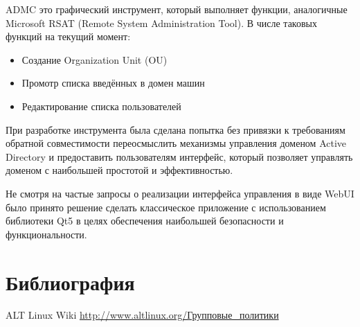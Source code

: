 ADMC это графический инструмент, который выполняет функции, аналогичные
Microsoft RSAT (Remote System Administration Tool). В числе таковых
функций на текущий момент:

\begin{itemize}
\item Создание Organization Unit (OU)
\item Промотр списка введённых в домен машин
\item Редактирование списка пользователей
\end{itemize}

При разработке инструмента была сделана попытка без привязки к
требованиям обратной совместимости переосмыслить механизмы управления
доменом Active Directory и предоставить пользователям интерфейс, который
позволяет управлять доменом с наибольшей простотой и эффективностью.

Не смотря на частые запросы о реализации интерфейса управления в виде
WebUI было принято решение сделать классическое приложение с
использованием библиотеки Qt5 в целях обеспечения наибольшей
безопасности и функциональности.

\section{Библиография}

\begin{thebibliography}{9}
 ALT Linux Wiki \url{http://www.altlinux.org/Групповые_политики}
\end{thebibliography}



